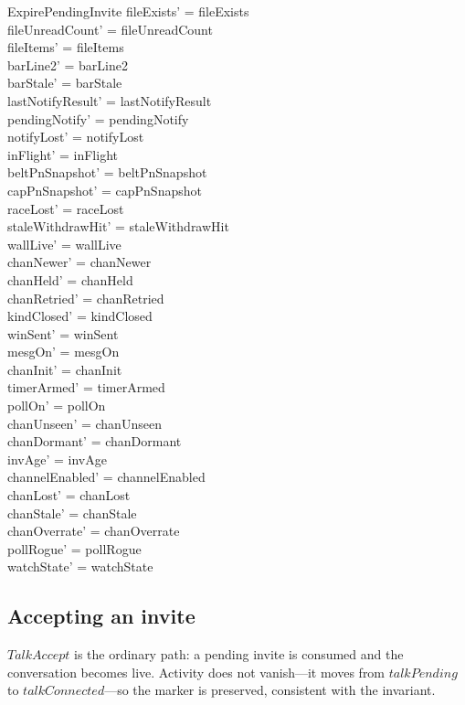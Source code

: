 \documentclass[a4paper,10pt,fleqn]{article}
\begin{document}
\begin{schema}{ExpirePendingInvite}
  fileExists' = fileExists \\
  fileUnreadCount' = fileUnreadCount \\
  fileItems' = fileItems \\
  barLine2' = barLine2 \\
  barStale' = barStale \\
  lastNotifyResult' = lastNotifyResult \\
  pendingNotify' = pendingNotify \\
  notifyLost' = notifyLost \\
  inFlight' = inFlight \\
  beltPnSnapshot' = beltPnSnapshot \\
  capPnSnapshot' = capPnSnapshot \\
  raceLost' = raceLost \\
  staleWithdrawHit' = staleWithdrawHit \\
  wallLive' = wallLive \\
  chanNewer' = chanNewer \\
  chanHeld' = chanHeld \\
  chanRetried' = chanRetried \\
  kindClosed' = kindClosed \\
  winSent' = winSent \\
  mesgOn' = mesgOn \\
  chanInit' = chanInit \\
  timerArmed' = timerArmed \\
  pollOn' = pollOn \\
  chanUnseen' = chanUnseen \\
  chanDormant' = chanDormant \\
  invAge' = invAge \\
  channelEnabled' = channelEnabled \\
  chanLost' = chanLost \\
  chanStale' = chanStale \\
  chanOverrate' = chanOverrate \\
  pollRogue' = pollRogue \\
  watchState' = watchState
\end{schema}

\subsection{Accepting an invite}

$TalkAccept$ is the ordinary path: a pending invite is consumed and the
conversation becomes live.  Activity does not vanish---it moves from
$talkPending$ to $talkConnected$---so the marker is preserved, consistent
with the invariant.
\end{document}
